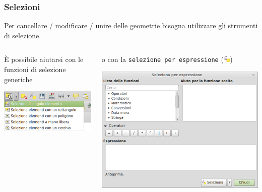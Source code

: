 \documentclass{beamer}
\begin{document}
{ \begin{frame}
	\frametitle{Selezioni}
	Per cancellare / modificare / unire delle geometrie bisogna utilizzare gli strumenti di selezione.
	\begin{columns}
        \begin{column}{0.5\textwidth}
            È possibile aiutarsi con le funzioni di selezione generiche
            \begin{center}
        		\includegraphics[width=\textwidth] {digitizing_pics/selezioni.png}
        	\end{center}
        \end{column}
        \begin{column}{0.5\textwidth}
        	o con la \texttt{selezione per espressione} (\includegraphics[width=0.04\textwidth] {digitizing_pics/sel_exp.png})
        	\begin{center}
        		\includegraphics[width=\textwidth] {digitizing_pics/seleziona_espressione.png}
        	\end{center}
        \end{column}
	\end{columns}


\end{frame}}
\end{document}
